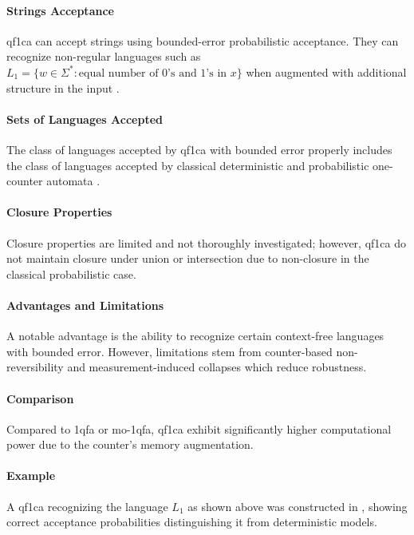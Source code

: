 \paragraph{Strings Acceptance} 
\gls{qf1ca} can accept strings using bounded-error probabilistic acceptance. They can recognize non-regular languages such as $L_1 = \{ w \in \Sigma^* : \text{equal number of 0's and 1's in } x \}$ when augmented with additional structure in the input \cite{bonner2001quantum}.

\paragraph{Sets of Languages Accepted} 
The class of languages accepted by \gls{qf1ca} with bounded error properly includes the class of languages accepted by classical deterministic and probabilistic one-counter automata \cite{bonner2001quantum}.

\paragraph{Closure Properties} 
Closure properties are limited and not thoroughly investigated; however, \gls{qf1ca} do not maintain closure under union or intersection due to non-closure in the classical probabilistic case.

\paragraph{Advantages and Limitations} 
A notable advantage is the ability to recognize certain context-free languages with bounded error. However, limitations stem from counter-based non-reversibility and measurement-induced collapses which reduce robustness.

\paragraph{Comparison} 
Compared to \gls{1qfa} or \gls{mo-1qfa}, \gls{qf1ca} exhibit significantly higher computational power due to the counter's memory augmentation.

\paragraph{Example} 
A \gls{qf1ca} recognizing the language $L_1$ as shown above was constructed in \cite{bonner2001quantum}, showing correct acceptance probabilities distinguishing it from deterministic models.

